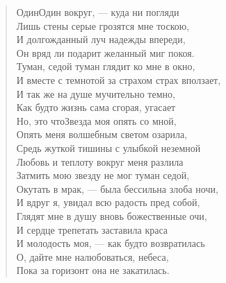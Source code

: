 \begin{verse}
Один\ldotst Один вокруг, --- куда ни погляди\\
Лишь стены серые грозятся мне тоскою,\\
И долгожданный луч надежды впереди,\\
Он вряд ли подарит желанный миг покоя.\\
Туман, седой туман глядит ко мне в окно,\\
И вместе с темнотой за страхом страх вползает,\\
И так же на душе мучительно темно,\\
Как будто жизнь сама сгорая, угасает\ldotst\\
Но, это что\ldotsq Звезда моя опять со мной,\\
Опять меня волшебным светом озарила,\\
Средь жуткой тишины с улыбкой неземной\\
Любовь и теплоту вокруг меня разлила\ldotst\\
Затмить мою звезду не мог туман седой,\\
Окутать в мрак, --- была бессильна злоба ночи,\\
И вдруг я, увидал всю радость пред собой,\\
Глядят мне в душу вновь божественные очи,\\
И сердце трепетать заставила краса\ldotst\\
И молодость моя, --- как будто возвратилась\ldotst\\
О, дайте мне налюбоваться, небеса,\\
Пока за горизонт она не закатилась.
\end{verse}

